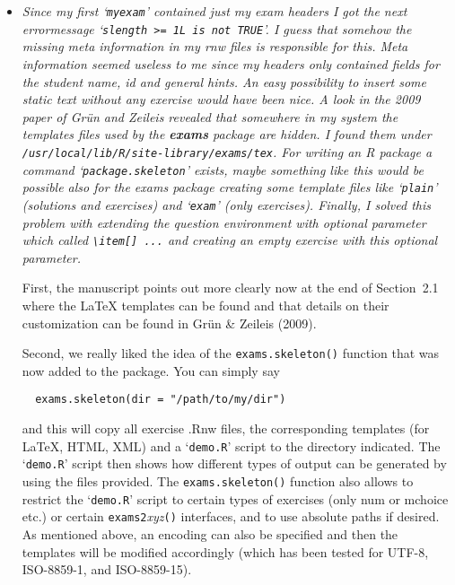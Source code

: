 \documentclass[a4paper]{article}
\begin{document}
\begin{itemize}
We tried to look at this in more detail, using the `\verb|exams_experiments.tex|'
provided by the reviewer. However, that was not in UTF-8 encoding (anymore)
and also did not contain exercises that could be made dynamic easily. Also,
we could not compile that {\LaTeX} file without errors.

As for the encoding issue: We typically recommend to write exercises as
ASCII files (by using {\LaTeX} commands for special characters) as these can
be easily compiled on different platforms using different locale settings.
However, we tried to facilitate using different encodings. In particular,
UTF-8 now works for all \texttt{exams2}\emph{xyz}\texttt{()} interfaces. Some examples and
illustrations have been added, including support in \texttt{exams.sekelton()}.

\item {\it
Since my first `\texttt{myexam}' contained just my exam headers I got the next
errormessage `\texttt{slength >= 1L is not TRUE}'.  I guess that somehow the
missing meta information in my rnw files is responsible for this.  Meta
information seemed useless to me since my headers only contained fields
for the student name, id and general hints.  An easy possibility to insert
some static text without any exercise would have been nice. A look in the
2009 paper of Gr\"un and Zeileis revealed that somewhere in my system the
templates files used by the \textbf{exams} package are hidden.  I found them
under \texttt{/usr/local/lib/R/site-library/exams/tex}.  For writing an R package
a command `\texttt{package.skeleton}' exists, maybe something like this would be
possible also for the exams package creating some template files like
`\texttt{plain}' (solutions and exercises) and `\texttt{exam}' (only exercises). Finally, I
solved this problem with extending the question environment with optional
parameter which called \verb|\item[] ...|  and creating an empty exercise with
this optional parameter.}

First, the manuscript points out more clearly now at the end of Section~2.1
where the {\LaTeX} templates can be found and that details on their customization
can be found in Gr\"un \& Zeileis (2009).

Second, we really liked the idea of the \texttt{exams.skeleton()} function that was
now added to the package. You can simply say
\begin{verbatim}
  exams.skeleton(dir = "/path/to/my/dir")
\end{verbatim}
and this will copy all exercise .Rnw files, the corresponding templates (for
{\LaTeX}, HTML, XML) and a `\texttt{demo.R}' script to the directory indicated. The `\texttt{demo.R}'
script then shows how different types of output can be generated by using
the files provided. The \texttt{exams.skeleton()} function also allows to restrict
the `\texttt{demo.R}' script to certain types of exercises (only num or mchoice etc.)
or certain \texttt{exams2}\emph{xyz}\texttt{()} interfaces, and to use absolute paths if desired. As
mentioned above, an encoding can also be specified and then the templates
will be modified accordingly (which has been tested for UTF-8, ISO-8859-1,
and ISO-8859-15).


\end{itemize}
\end{document}
